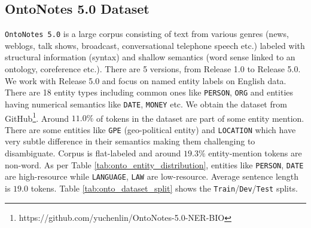 \subsection{OntoNotes 5.0 Dataset}

\texttt{OntoNotes 5.0}\cite{weischedel2013ontonotes} is a large corpus consisting of text from various genres (news, weblogs, talk shows, broadcast, conversational
telephone speech etc.) labeled with structural information (syntax) and shallow semantics (word sense linked to an ontology, coreference etc.). There are
5 versions, from Release 1.0 to Release 5.0. We work with Release 5.0 and focus on named entity labels on English data. There are 18 entity types including common ones like \texttt{PERSON}, \texttt{ORG} and entities having numerical semantics like \texttt{DATE}, \texttt{MONEY} etc. We obtain the dataset from GitHub\footnote{https://github.com/yuchenlin/OntoNotes-5.0-NER-BIO}. Around $11.0\%$ of tokens in the dataset are part of some entity mention. There are some entities like \texttt{GPE} (geo-political entity) and \texttt{LOCATION} which have very subtle difference in their semantics making them challenging to disambiguate. Corpus is flat-labeled and around $19.3\%$  entity-mention tokens are non-word. As per Table \ref{tab:onto_entity_distribution}, entities like \texttt{PERSON}, \texttt{DATE} are high-resource while \texttt{LANGUAGE}, \texttt{LAW} are low-resource. Average sentence length is $19.0$ tokens. Table \ref{tab:onto_dataset_split} shows the \texttt{Train}/\texttt{Dev}/\texttt{Test} splits. 

